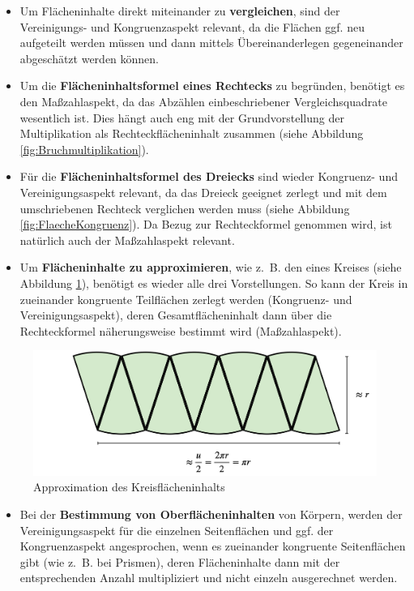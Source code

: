 \documentclass[
  ngerman,
]{scrbook}
\providecommand{\tightlist}{%
  \setlength{\itemsep}{0pt}\setlength{\parskip}{0pt}}
\theoremstyle{definition}
\theoremstyle{definition}
\theoremstyle{definition}
\theoremstyle{definition}
\theoremstyle{remark}
\begin{document}
\begin{itemize}
\tightlist
\item
  Um Flächeninhalte direkt miteinander zu \textbf{vergleichen}, sind der Vereinigungs- und Kongruenzaspekt relevant, da die Flächen ggf. neu aufgeteilt werden müssen und dann mittels Übereinanderlegen gegeneinander abgeschätzt werden können.
\item
  Um die \textbf{Flächeninhaltsformel eines Rechtecks} zu begründen, benötigt es den Maßzahlaspekt, da das Abzählen einbeschriebener Vergleichsquadrate wesentlich ist. Dies hängt auch eng mit der Grundvorstellung der Multiplikation als Rechteckflächeninhalt zusammen (siehe Abbildung \ref{fig:Bruchmultiplikation}).
\item
  Für die \textbf{Flächeninhaltsformel des Dreiecks} sind wieder Kongruenz- und Vereinigungsaspekt relevant, da das Dreieck geeignet zerlegt und mit dem umschriebenen Rechteck verglichen werden muss (siehe Abbildung \ref{fig:FlaecheKongruenz}). Da Bezug zur Rechteckformel genommen wird, ist natürlich auch der Maßzahlaspekt relevant.
\item
  Um \textbf{Flächeninhalte zu approximieren}, wie z.~B. den eines Kreises (siehe Abbildung \ref{fig:FlaecheKreis}), benötigt es wieder alle drei Vorstellungen. So kann der Kreis in zueinander kongruente Teilflächen zerlegt werden (Kongruenz- und Vereinigungsaspekt), deren Gesamtflächeninhalt dann über die Rechteckformel näherungsweise bestimmt wird (Maßzahlaspekt).
\end{itemize}

\begin{figure}

{\centering \includegraphics[width=0.75\linewidth]{pictures/5-abb-Kreis} 

}

\caption{Approximation des Kreisflächeninhalts}\label{fig:FlaecheKreis}
\end{figure}

\begin{itemize}
\tightlist
\item
  Bei der \textbf{Bestimmung von Oberflächeninhalten} von Körpern, werden der Vereinigungsaspekt für die einzelnen Seitenflächen und ggf. der Kongruenzaspekt angesprochen, wenn es zueinander kongruente Seitenflächen gibt (wie z.~B. bei Prismen), deren Flächeninhalte dann mit der entsprechenden Anzahl multipliziert und nicht einzeln ausgerechnet werden.
\end{itemize}
\end{document}
